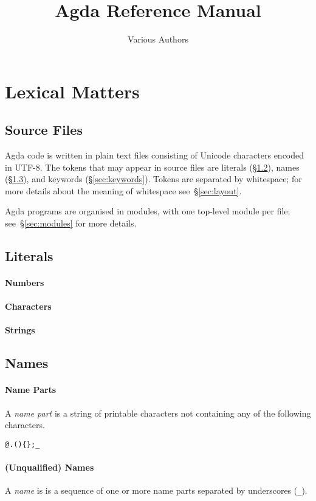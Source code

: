 \documentclass{article}
\begin{document}
\title{Agda Reference Manual}
\author{Various Authors}
\maketitle
\section{Lexical Matters}
\subsection{Source Files}
Agda code is written in plain text files consisting of Unicode characters encoded in UTF-8.
The tokens that may appear in source files are literals (\S\ref{sec:literals}), names (\S\ref{sec:names}), and keywords (\S\ref{sec:keywords}).
Tokens are separated by whitespace; for more details about the meaning of whitespace see~\S\ref{sec:layout}.

Agda programs are organised in modules, with one top-level module per file; see~\S\ref{sec:modules} for more details.
\subsection{Literals}
\label{sec:literals}
\paragraph{Numbers}
\paragraph{Characters}
\paragraph{Strings}
\subsection{Names}
\label{sec:names}
\paragraph{Name Parts}
A \emph{name part} is a string of printable characters not containing any of the following characters.
\begin{verbatim}
@.(){};_
\end{verbatim}
\paragraph{(Unqualified) Names}
A \emph{name} is is a sequence of one or more name parts separated by underscores (\texttt{\_}).
\end{document}
